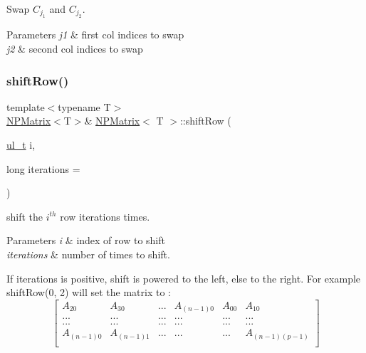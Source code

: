Swap $ C_{j_1} $ and $ C_{j_2} $. 


\begin{DoxyParams}{Parameters}
{\em j1} & first col indices to swap \\
\hline
{\em j2} & second col indices to swap \\
\hline
\end{DoxyParams}
\mbox{\label{class_n_p_matrix_a8927e2dc64af30c6f619a93678332093}} 
\subsubsection{\texorpdfstring{shiftRow()}{shiftRow()}}
{\footnotesize\ttfamily template$<$typename T$>$ \\
\mbox{\hyperlink{class_n_p_matrix}{N\+P\+Matrix}}$<$T$>$\& \mbox{\hyperlink{class_n_p_matrix}{N\+P\+Matrix}}$<$ T $>$\+::shift\+Row (\begin{DoxyParamCaption}\item[{\mbox{\hyperlink{typedef_8h_a1b140a2034db3f5dfe18a987745df43a}{ul\+\_\+t}}}]{i,  }\item[{long}]{iterations = {} }\end{DoxyParamCaption})\hspace{0.3cm}{\ttfamily [inline]}}



shift the $ i^{th} $ row {\ttfamily iterations} times. 


\begin{DoxyParams}{Parameters}
{\em i} & index of row to shift \\
\hline
{\em iterations} & number of times to shift.\\
\hline
\end{DoxyParams}
If {\ttfamily iterations} is positive, shift is powered to the left, else to the right. For example {\ttfamily shift\+Row(0, 2)} will set the matrix to \+: \[ \begin{bmatrix} A_{20} & A_{30} & ... & A_{(n-1)0} & A_{00} & A_{10} \\ ... & ... & ... & ... & ... & ... \\ ... & ... & ... & ... & ... & ... \\ A_{(n-1)0} & A_{(n-1)1} & ... & ... & ... & A_{(n-1)(p-1)}\\ \end{bmatrix} \] \mbox{\label{class_n_p_matrix_ae039695bf1464be6563f81d6e0c502d8}} 
